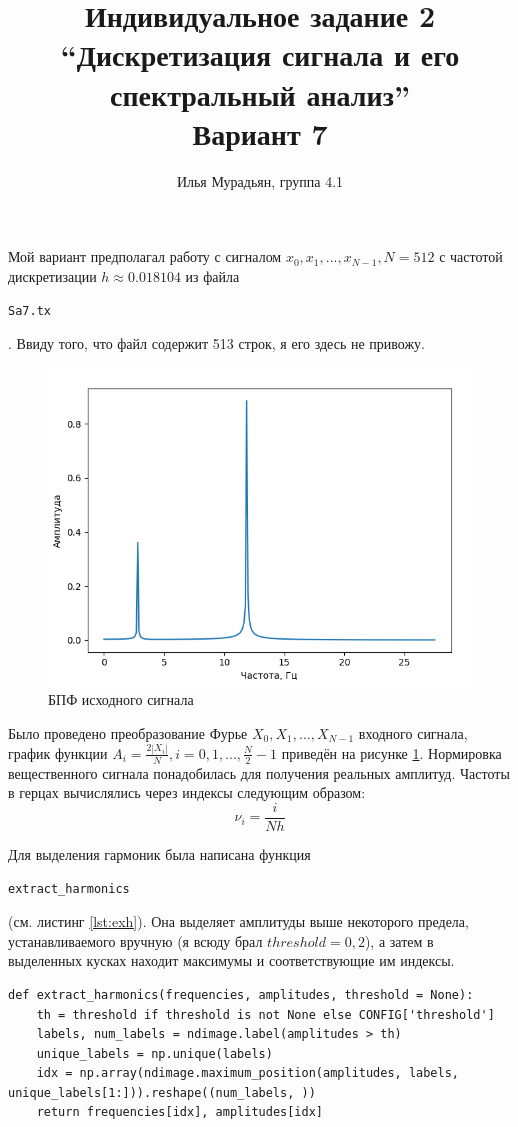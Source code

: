 \documentclass[a4paper,14pt]{article}
\title{Индивидуальное задание 2\\
	``Дискретизация сигнала и его спектральный анализ''\\
	Вариант 7}
\author{Илья Мурадьян, группа 4.1}
\newcommand{\code}[1]{\begin{normalsize}\texttt{#1}\end{normalsize}}
\theoremstyle{definition}
\begin{document}
	\Large
	
	\maketitle
	
	Мой вариант предполагал работу с сигналом $x_0, x_1, ..., x_{N - 1}, N = 512$ с частотой дискретизации $h \approx 0.018104$ из файла \code{Sa7.tx}. Ввиду того, что файл содержит 513 строк, я его здесь не привожу.
	\begin{figure}[H]%
		\includegraphics[width=0.8\linewidth, center]{Figure1} 
		\caption{БПФ исходного сигнала}
		\label{fig:f1}
	\end{figure}
	
	Было проведено преобразование Фурье $X_0, X_1, ..., X_{N - 1}$ входного сигнала, график функции $A_i = \frac{2 |X_i|}{N}, i = 0, 1, ..., \frac{N}{2} - 1$ приведён на рисунке \ref{fig:f1}. Нормировка вещественного сигнала понадобилась для получения реальных амплитуд. Частоты в герцах вычислялись через индексы следующим образом:
	\begin{equation}
		\nu_i = \frac{i}{N h}
	\end{equation}
	
	Для выделения гармоник была написана функция \code{extract\_harmonics} (см. листинг \ref{lst:exh}). Она выделяет амплитуды выше некоторого предела, устанавливаемого вручную (я всюду брал $threshold=0,2$), а затем в выделенных кусках находит максимумы и соответствующие им индексы.
	\begin{lstlisting}[style=py, caption={Функция extract\_harmonics}, label={lst:exh}]
def extract_harmonics(frequencies, amplitudes, threshold = None):
	th = threshold if threshold is not None else CONFIG['threshold']
	labels, num_labels = ndimage.label(amplitudes > th)
	unique_labels = np.unique(labels)
	idx = np.array(ndimage.maximum_position(amplitudes, labels, unique_labels[1:])).reshape((num_labels, ))
	return frequencies[idx], amplitudes[idx]
	\end{lstlisting} 
	
\end{document}
